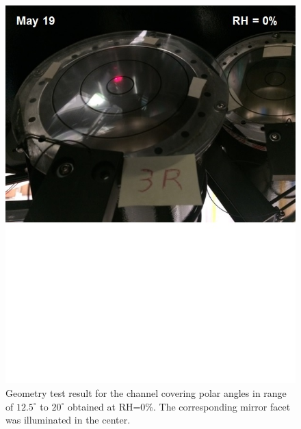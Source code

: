 \begin{figure}[ht]
    \centering
    \includegraphics[width=1.0\linewidth,trim={0 8.5cm 0 0},clip]{images/GEO_TEST_3_Zero.jpg}
    \caption{Geometry test result for the channel covering polar angles in range of $12.5^\circ$ to $20^\circ$ obtained at RH=0\%. The corresponding mirror facet was illuminated in the center.}
    \label{fig:GEO_TEST_3_Zero}
\end{figure}
        
